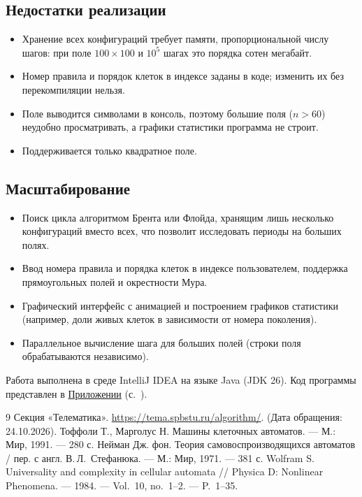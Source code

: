 \documentclass[a4paper,14pt]{extarticle}
\begin{document}
\subsection*{Недостатки реализации}

\begin{itemize}
	\item Хранение всех конфигураций требует памяти, пропорциональной числу шагов: при поле $100 \times 100$ и $10^5$ шагах это порядка сотен мегабайт.
	\item Номер правила и порядок клеток в индексе заданы в коде; изменить их без перекомпиляции нельзя.
	\item Поле выводится символами в консоль, поэтому большие поля ($n > 60$) неудобно просматривать, а графики статистики программа не строит.
	\item Поддерживается только квадратное поле.
\end{itemize}

\subsection*{Масштабирование}

\begin{itemize}
	\item Поиск цикла алгоритмом Брента или Флойда, хранящим лишь несколько конфигураций вместо всех, что позволит исследовать периоды на больших полях.
	\item Ввод номера правила и порядка клеток в индексе пользователем, поддержка прямоугольных полей и окрестности Мура.
	\item Графический интерфейс с анимацией и построением графиков статистики (например, доли живых клеток в зависимости от номера поколения).
	\item Параллельное вычисление шага для больших полей (строки поля обрабатываются независимо).
\end{itemize}

Работа выполнена в среде IntelliJ IDEA на языке Java (JDK 26). Код программы представлен в \hyperref[app:code]{Приложении} (с.~\pageref{app:code}).

\newpage
{}
{}
\begin{thebibliography}{9}
	 Секция «Телематика». \url{https://tema.spbstu.ru/algorithm/}. (Дата обращения: 24.10.2026).
	 Тоффоли Т., Марголус Н. Машины клеточных автоматов. --- М.: Мир, 1991. --- 280 с.
	 Нейман Дж. фон. Теория самовоспроизводящихся автоматов / пер. с англ. В.\,Л.~Стефанюка. --- М.: Мир, 1971. --- 381 с.
	 Wolfram S. Universality and complexity in cellular automata // Physica D: Nonlinear Phenomena. --- 1984. --- Vol.~10, no.~1--2. --- P.~1--35.
\end{thebibliography}
\end{document}
